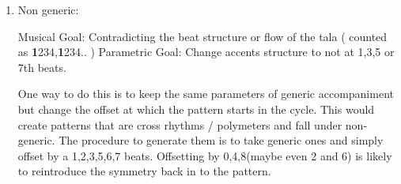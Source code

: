 \begin{enumerate}
\item Non generic:

Musical Goal: Contradicting the beat structure or flow of the tala ( counted as \textbf{1}234,\textbf{1}234.. )
Parametric Goal: Change accents structure to not at 1,3,5 or 7th beats.

One way to do this is to keep the same parameters of generic accompaniment but change the offset at which the pattern starts in the cycle. This would create patterns that are cross rhythms / polymeters and fall under non-generic. The procedure to generate them is to take generic ones and simply offset by a 1,2,3,5,6,7 beats. Offsetting by 0,4,8(maybe even 2 and 6) is likely to reintroduce the symmetry back in to the pattern. 


\end{enumerate}
